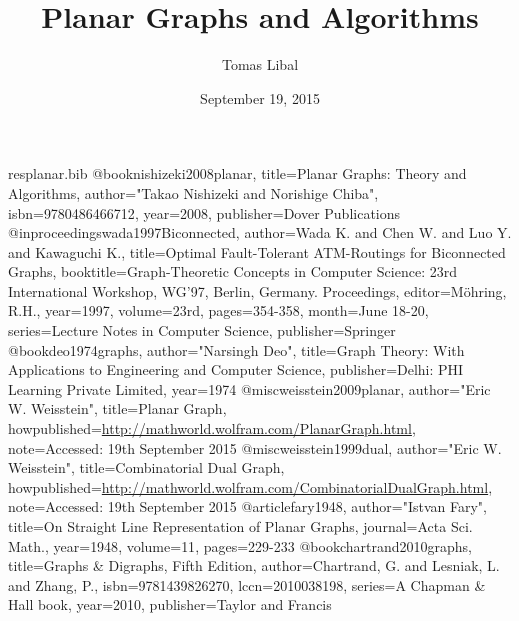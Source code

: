 \begin{filecontents*}{resplanar.bib}
@book{nishizeki2008planar,
    title={Planar Graphs: Theory and Algorithms},
    author="Takao {Nishizeki} and Norishige {Chiba}",
    isbn={9780486466712},
    year={2008},
    publisher={Dover Publications}
  }
  @inproceedings{wada1997Biconnected,
    author={Wada K. and Chen W. and Luo Y. and Kawaguchi K.},
    title={Optimal Fault-Tolerant ATM-Routings for Biconnected Graphs},
    booktitle={Graph-Theoretic Concepts in Computer Science: 23rd International Workshop, WG'97, Berlin, Germany. Proceedings},
    editor={M{\"o}hring, R.H.},
    year={1997},
    volume={23rd},
    pages={354-358},
    month={June 18-20},
    series={Lecture Notes in Computer Science},
    publisher={Springer}
  }
  @book{deo1974graphs,
    author="Narsingh {Deo}",
    title={Graph Theory: With Applications to Engineering and Computer Science},
    publisher={Delhi: PHI Learning Private Limited},
    year={1974}
  }
  @misc{weisstein2009planar,
    author="Eric W. {Weisstein}",
    title={Planar Graph},
    howpublished={\url{http://mathworld.wolfram.com/PlanarGraph.html}},
    note={Accessed: 19th September 2015}
  }
  @misc{weisstein1999dual,
    author="Eric W. {Weisstein}",
    title={Combinatorial Dual Graph},
    howpublished={\url{http://mathworld.wolfram.com/CombinatorialDualGraph.html}},
    note={Accessed: 19th September 2015}
  }
  @article{fary1948,
    author="Istvan {Fary}",
    title={On Straight Line Representation of Planar Graphs},
    journal={Acta Sci. Math.},
    year={1948},
    volume={11},
    pages={229-233}
    }
  @book{chartrand2010graphs,
    title={Graphs \& Digraphs, Fifth Edition},
    author={Chartrand, G. and Lesniak, L. and Zhang, P.},
    isbn={9781439826270},
    lccn={2010038198},
    series={A Chapman \& Hall book},
    year={2010},
    publisher={Taylor and Francis}
  }
\end{filecontents*}

\documentclass[11pt]{article}

\usepackage{tikz}

\usepackage[backend=biber]{biblatex}


\title{Planar Graphs and Algorithms}
\author{Tomas Libal}
\date{September 19, 2015}



\maketitle

